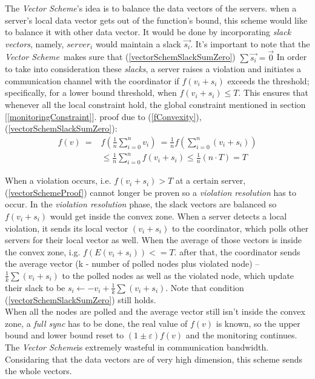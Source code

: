 \documentclass[10pt, conference]{IEEEtran}
\newcommand{\vecScheme}{\textit{Vector Scheme}}
\begin{document}
The \vecScheme 's idea is to balance the data vectors of the servers. when a server's local data vector gets out of the function's bound, this scheme would like to balance it with other data vector. It would be done by incorporating \textit{slack vectors}, namely, $server_i$ would maintain a slack $\overrightarrow{s_i}$. It's important to note that the \vecScheme \  makes sure that (\label{vectorSchemSlackSumZero}\ref{vectorSchemSlackSumZero}) $\sum{\overrightarrow{s_i}} = \textstyle \overrightarrow{0}$
In order to take into consideration these \textit{slacks}, a server raises a violation and initiates a communication channel with the coordinator if $f(v_i+s_i)$ exceeds the threshold; specifically, for a lower bound threshold, when $f(v_i+s_i) \leqslant T$. This ensures that whenever all the local constraint hold, the global constraint mentioned in section [\ref{monitoringConstraint}]. proof due to (\ref{fConvexity}), (\ref{vectorSchemSlackSumZero}):
\begin{equation}
\label{vectorSchemeProof}
\begin{aligned}
 f(v)  \
	    = {} & f\left(\frac{1}{n} \sum\limits_{i=0}^{n}{v_i}\right)  \
        =   \frac{1}{n} f\left(\sum\limits_{i=0}^{n}{(v_i + s_i)}\right) \\
     & \leq   \frac{1}{n} \sum\limits_{i=0}^{n}{f(v_i + s_i)}
       \leq   \frac{1}{n}(n \cdot T)
       = T
\end{aligned}
\end{equation}

When a violation occurs, i.e. $f(v_i+s_i) > T$ at a certain server, (\ref{vectorSchemeProof}) cannot longer be proven so a \textit{violation resolution} has to occur. In the \textit{violation resolution} phase, the slack vectors are balanced so $f(v_i+s_i)$ would get inside the convex zone. When a server detects a local violation, it sends its local vector $(v_i + s_i)$ to the coordinator, which polls other servers for their local vector as well. When the average of those vectors is inside the convex zone, i.g. $f(E(v_i + s_i)) <= T$. after that, the coordinator sends the average vector (k - number of polled nodes plus violated node) -- $\frac{1}{k}\sum{(v_i + s_i)}$ to the polled nodes as well as the violated node, which update their slack to be $s_i \leftarrow -v_i + \frac{1}{k}\sum{(v_i + s_i)} $. Note that condition (\ref{vectorSchemSlackSumZero}) still holds. \\
When all the nodes are polled and the average vector still isn't inside the convex zone, a \textit{full sync} has to be done, the real value of $f(v)$ is known, so the upper bound and lower bound reset to $(1 \pm \varepsilon )f(v)$ and the monitoring continues. \\
The \vecScheme is extremely wasteful in communication bandwidth. Considaring that the data vectors are of very high dimension, this scheme sends the whole vectors.
\end{document}
